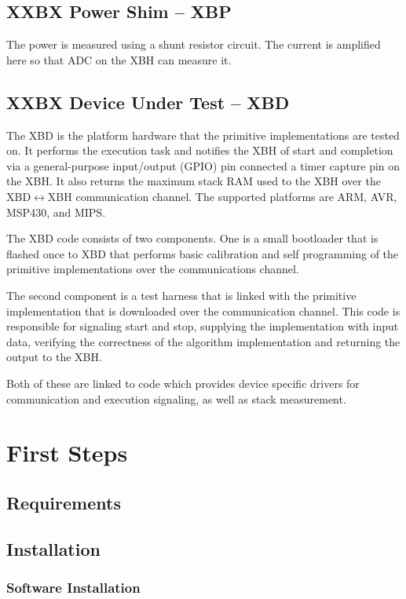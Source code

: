 \documentclass[twoside,11pt]{cergdoc}
\begin{document}
  \section{XXBX Power Shim -- XBP}
 The power is measured
using a shunt resistor circuit. The current is amplified
here so that ADC on the XBH can measure it.


  \section{XXBX Device Under Test -- XBD}
The XBD is the platform hardware that the primitive implementations are tested
on. It performs the execution task and
notifies the XBH of start and completion via a general-purpose input/output
(GPIO) pin connected a timer capture pin on the XBH. It also returns the maximum
stack RAM used to the XBH over the XBD$\leftrightarrow$XBH communication
    channel. The supported platforms are ARM, AVR, MSP430, and MIPS. 

The XBD code consists of two components. One is a small bootloader that is
flashed once to XBD that performs basic calibration and self programming of the
primitive implementations over the communications channel. 

The second component is a test harness that is linked with the
primitive implementation that is downloaded over the communication channel. This
code is responsible for signaling start and stop, supplying the implementation
with input data, verifying the correctness of the algorithm implementation and
returning the output to the XBH. 

Both of these are linked to code which provides device specific drivers for
communication and execution signaling, as well as stack measurement. 


\chapter{First Steps}
  \section{Requirements}
  \section{Installation}
    \subsection{Software Installation}
\end{document}
